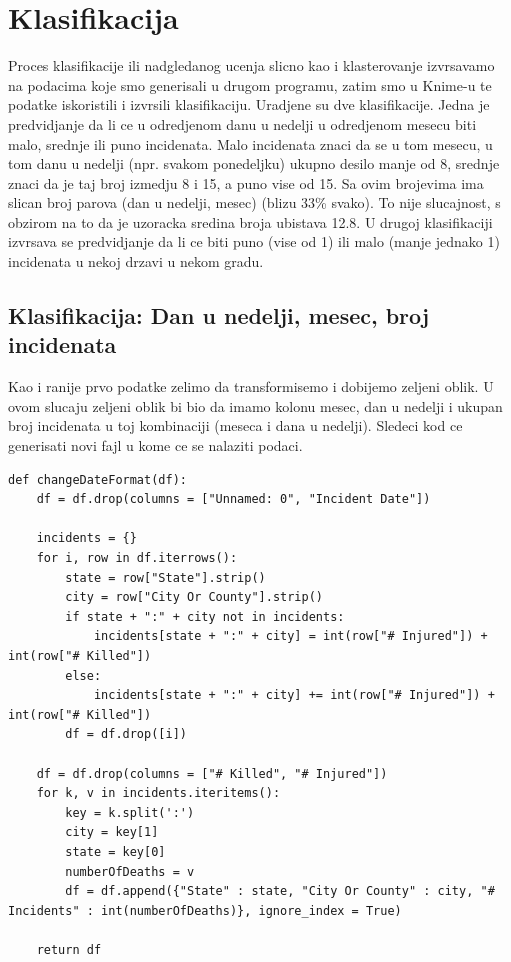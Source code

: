 \documentclass[11pt]{article} %
\begin{document}
	\newpage
	\section{Klasifikacija}
	Proces klasifikacije ili nadgledanog ucenja slicno kao i klasterovanje izvrsavamo na podacima koje smo generisali u drugom programu, zatim smo u 
	Knime-u te podatke iskoristili i izvrsili klasifikaciju. 
	Uradjene su dve klasifikacije. 
	Jedna je predvidjanje da li ce u odredjenom danu u nedelji u odredjenom mesecu biti malo, srednje ili puno incidenata. 
	Malo incidenata znaci da se u tom mesecu, u tom danu u nedelji (npr. svakom ponedeljku) ukupno desilo manje od 8, srednje znaci da je taj broj izmedju 8 i 15, 
	a puno vise od 15. Sa ovim brojevima ima slican broj parova (dan u nedelji, mesec) (blizu 33\% svako). To nije slucajnost, s obzirom na to da je 
	uzoracka sredina broja ubistava 12.8.
	U drugoj klasifikaciji izvrsava se predvidjanje da li ce biti puno (vise od 1) ili malo (manje jednako 1) incidenata u nekoj drzavi u nekom gradu.
	
	\subsection{Klasifikacija: Dan u nedelji, mesec, broj incidenata}
	Kao i ranije prvo podatke zelimo da transformisemo i dobijemo zeljeni oblik. U ovom slucaju zeljeni oblik bi bio da imamo kolonu mesec, dan u nedelji i 
	ukupan broj incidenata u toj kombinaciji (meseca i dana u nedelji). Sledeci kod ce generisati novi fajl u kome ce se nalaziti podaci.

	\begin{lstlisting}
def changeDateFormat(df):
	df = df.drop(columns = ["Unnamed: 0", "Incident Date"])
	
	incidents = {}
	for i, row in df.iterrows():
		state = row["State"].strip()
		city = row["City Or County"].strip()
		if state + ":" + city not in incidents:
			incidents[state + ":" + city] = int(row["# Injured"]) + int(row["# Killed"])
		else:
			incidents[state + ":" + city] += int(row["# Injured"]) + int(row["# Killed"])
		df = df.drop([i])
	
	df = df.drop(columns = ["# Killed", "# Injured"])
	for k, v in incidents.iteritems():
		key = k.split(':')
		city = key[1]
		state = key[0]
		numberOfDeaths = v
		df = df.append({"State" : state, "City Or County" : city, "# Incidents" : int(numberOfDeaths)}, ignore_index = True)
	
	return df
	\end{lstlisting}
	
\end{document}
